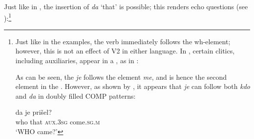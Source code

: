 \documentclass[output=paper,modfonts, hidelinks, newtxmath]{langscibook}
\begin{document}
\newpage 
Just like in , the insertion of \textit{da} `that' is possible; this renders echo questions (see \citealt{hladnik2010}):\footnote{Just like in the  examples, the verb immediately follows the wh-element; however, this is not an effect of V2 in either language. In , certain clitics, including auxiliaries, appear in a , as in :

\z

\noindent As can be seen, the  \textit{je} follows the element \textit{me}, and is hence the second element in the . However, as shown by , it appears that \textit{je} can follow both \textit{kdo} and \textit{da} in doubly filled COMP patterns:

\ea
	 {\normalfont da} {\normalfont je} {\normalfont pri\v{s}el?} \label{kdodaje}\\
			who that \textsc{aux.3sg} come.\textsc{sg.m}\\
	\glt `WHO came?'
\z

}
\end{document}
